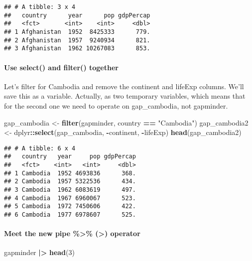 \documentclass[
]{article}
\newenvironment{Shaded}{\begin{snugshade}}{\end{snugshade}}
\newcommand{\DecValTok}[1]{\textcolor[rgb]{0.00,0.00,0.81}{#1}}
\newcommand{\FunctionTok}[1]{\textcolor[rgb]{0.13,0.29,0.53}{\textbf{#1}}}
\newcommand{\NormalTok}[1]{#1}
\newcommand{\OtherTok}[1]{\textcolor[rgb]{0.56,0.35,0.01}{#1}}
\newcommand{\SpecialCharTok}[1]{\textcolor[rgb]{0.81,0.36,0.00}{\textbf{#1}}}
\newcommand{\StringTok}[1]{\textcolor[rgb]{0.31,0.60,0.02}{#1}}
\begin{document}
\begin{verbatim}
## # A tibble: 3 x 4
##   country      year      pop gdpPercap
##   <fct>       <int>    <int>     <dbl>
## 1 Afghanistan  1952  8425333      779.
## 2 Afghanistan  1957  9240934      821.
## 3 Afghanistan  1962 10267083      853.
\end{verbatim}

\paragraph{Use select() and filter()
together}\label{use-select-and-filter-together}

Let's filter for Cambodia and remove the continent and lifeExp columns.
We'll save this as a variable. Actually, as two temporary variables,
which means that for the second one we need to operate on gap\_cambodia,
not gapminder.

\begin{Shaded}
\begin{Highlighting}[]
\NormalTok{gap\_cambodia }\OtherTok{\textless{}{-}} \FunctionTok{filter}\NormalTok{(gapminder, country }\SpecialCharTok{==} \StringTok{"Cambodia"}\NormalTok{)}
\NormalTok{gap\_cambodia2 }\OtherTok{\textless{}{-}}\NormalTok{ dplyr}\SpecialCharTok{::}\FunctionTok{select}\NormalTok{(gap\_cambodia, }\SpecialCharTok{{-}}\NormalTok{continent, }\SpecialCharTok{{-}}\NormalTok{lifeExp)}
\FunctionTok{head}\NormalTok{(gap\_cambodia2)}
\end{Highlighting}
\end{Shaded}

\begin{verbatim}
## # A tibble: 6 x 4
##   country   year     pop gdpPercap
##   <fct>    <int>   <int>     <dbl>
## 1 Cambodia  1952 4693836      368.
## 2 Cambodia  1957 5322536      434.
## 3 Cambodia  1962 6083619      497.
## 4 Cambodia  1967 6960067      523.
## 5 Cambodia  1972 7450606      422.
## 6 Cambodia  1977 6978607      525.
\end{verbatim}

\paragraph{Meet the new pipe \%\textgreater\% (\textbar\textgreater)
operator}\label{meet-the-new-pipe-operator}

\begin{Shaded}
\begin{Highlighting}[]
\NormalTok{gapminder }\SpecialCharTok{|\textgreater{}} \FunctionTok{head}\NormalTok{(}\DecValTok{3}\NormalTok{)}
\end{Highlighting}
\end{Shaded}
\end{document}
